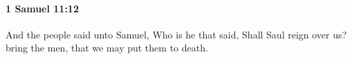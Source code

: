 
		\paragraph{1 Samuel 11:12} %
			\label{1SAMUEL-11-12}

			And the people said unto Samuel, Who is he that said, Shall Saul reign over us? bring the men, that we may put them to death.


